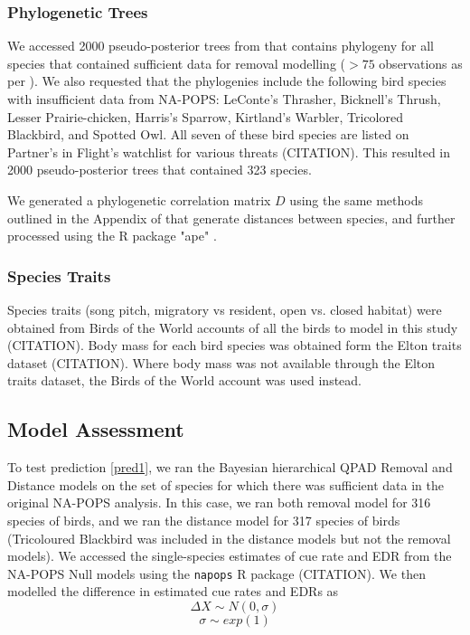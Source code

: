 \documentclass[12pt]{article}
\begin{document}
\subsubsection{Phylogenetic Trees}
\par We accessed 2000 pseudo-posterior trees from \citet{jetz_global_2012} that contains phylogeny for all species that contained sufficient data for removal modelling ($>75$ observations as per \cite{edwards_point_2023,solymos_evaluating_2018,buckland_introduction_2001}). 
We also requested that the phylogenies include the following bird species with insufficient data from NA-POPS: LeConte's Thrasher, Bicknell's Thrush, Lesser Prairie-chicken, Harris's Sparrow, Kirtland's Warbler, Tricolored Blackbird, and Spotted Owl. 
All seven of these bird species are listed on Partner's in Flight's watchlist for various threats (CITATION). 
This resulted in 2000 pseudo-posterior trees that contained 323 species.

\par We generated a phylogenetic correlation matrix $D$ using the same methods outlined in the Appendix of \citet{solymos_phylogeny_2018} that generate distances between species, and further processed using the R package "ape" \citet{paradis_ape_2019}.

\subsubsection{Species Traits}
\par Species traits (song pitch, migratory vs resident, open vs. closed habitat) were obtained from Birds of the World accounts of all the birds to model in this study (CITATION). 
Body mass for each bird species was obtained form the Elton traits dataset (CITATION). 
Where body mass was not available through the Elton traits dataset, the Birds of the World account was used instead.

\subsection{Model Assessment}

\par To test prediction \ref{pred1}, we ran the Bayesian hierarchical QPAD Removal and Distance models on the set of species for which there was sufficient data in the original NA-POPS analysis.
In this case, we ran both removal model for 316 species of birds, and we ran the distance model for 317 species of birds (Tricoloured Blackbird was included in the distance models but not the removal models).
We accessed the single-species estimates of cue rate and EDR from the NA-POPS Null models using the \texttt{napops} R package (CITATION).
We then modelled the difference in estimated cue rates and EDRs as
$$\Delta X \sim N(0,\sigma)$$
$$\sigma \sim exp(1)$$
\end{document}
